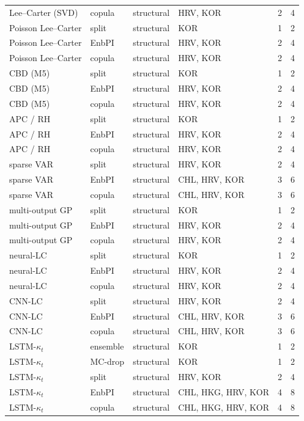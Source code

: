 {\begin{longtable}{@{}llp{1.5cm}p{5.6cm}rr@{}}
Lee--Carter (SVD) & copula & structural & HRV, KOR & 2 & 4 \\
Poisson Lee--Carter & split & structural & KOR & 1 & 2 \\
Poisson Lee--Carter & EnbPI & structural & HRV, KOR & 2 & 4 \\
Poisson Lee--Carter & copula & structural & HRV, KOR & 2 & 4 \\
CBD (M5) & split & structural & KOR & 1 & 2 \\
CBD (M5) & EnbPI & structural & HRV, KOR & 2 & 4 \\
CBD (M5) & copula & structural & HRV, KOR & 2 & 4 \\
APC / RH & split & structural & KOR & 1 & 2 \\
APC / RH & EnbPI & structural & HRV, KOR & 2 & 4 \\
APC / RH & copula & structural & HRV, KOR & 2 & 4 \\
sparse VAR & split & structural & HRV, KOR & 2 & 4 \\
sparse VAR & EnbPI & structural & CHL, HRV, KOR & 3 & 6 \\
sparse VAR & copula & structural & CHL, HRV, KOR & 3 & 6 \\
multi-output GP & split & structural & KOR & 1 & 2 \\
multi-output GP & EnbPI & structural & HRV, KOR & 2 & 4 \\
multi-output GP & copula & structural & HRV, KOR & 2 & 4 \\
neural-LC & split & structural & KOR & 1 & 2 \\
neural-LC & EnbPI & structural & HRV, KOR & 2 & 4 \\
neural-LC & copula & structural & HRV, KOR & 2 & 4 \\
CNN-LC & split & structural & HRV, KOR & 2 & 4 \\
CNN-LC & EnbPI & structural & CHL, HRV, KOR & 3 & 6 \\
CNN-LC & copula & structural & CHL, HRV, KOR & 3 & 6 \\
LSTM-$\kappa_t$ & ensemble & structural & KOR & 1 & 2 \\
LSTM-$\kappa_t$ & MC-drop & structural & KOR & 1 & 2 \\
LSTM-$\kappa_t$ & split & structural & HRV, KOR & 2 & 4 \\
LSTM-$\kappa_t$ & EnbPI & structural & CHL, HKG, HRV, KOR & 4 & 8 \\
LSTM-$\kappa_t$ & copula & structural & CHL, HKG, HRV, KOR & 4 & 8 \\

\end{longtable}}
